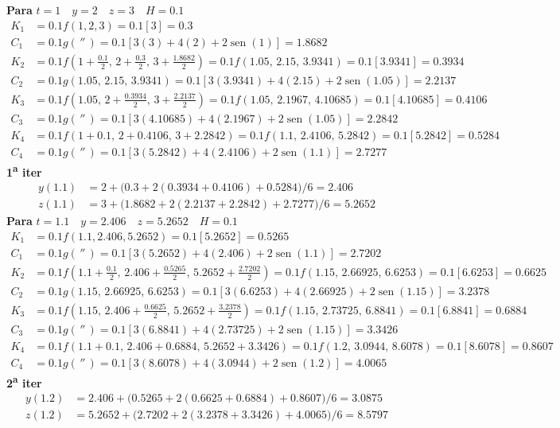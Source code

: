 \documentclass[11pt]{article}
\DeclareMathOperator{\sen}{sen}
\begin{document}
{\small
\textbf{Para} $t=1\quad y=2\quad z=3\quad H=0.1$\\[-2pt]
\begin{align*}
K_1&=0.1f(1,2,3)=0.1[3]=0.3\\
C_1&=0.1g(\,''\,)=0.1\left[3(3)+4(2)+2\sen(1)\right]=1.8682\\
K_2&=0.1f\left(1+\tfrac{0.1}{2},\,2+\tfrac{0.3}{2},\,3+\tfrac{1.8682}{2}\right)=0.1f(1.05,\,2.15,\,3.9341)=0.1[3.9341]=0.3934\\
C_2&=0.1g(1.05,\,2.15,\,3.9341)=0.1\left[3(3.9341)+4(2.15)+2\sen(1.05)\right]=2.2137\\
K_3&=0.1f\left(1.05,\,2+\tfrac{0.3934}{2},\,3+\tfrac{2.2137}{2}\right)=0.1f(1.05,\,2.1967,\,4.10685)=0.1[4.10685]=0.4106\\
C_3&=0.1g(\,''\,)=0.1\left[3(4.10685)+4(2.1967)+2\sen(1.05)\right]=2.2842\\
K_4&=0.1f(1+0.1,\,2+0.4106,\,3+2.2842)=0.1f(1.1,\,2.4106,\,5.2842)=0.1[5.2842]=0.5284\\
C_4&=0.1g(\,''\,)=0.1\left[3(5.2842)+4(2.4106)+2\sen(1.1)\right]=2.7277
\end{align*}
\textbf{1\textsuperscript{a} iter}\vspace{-4pt}
\begin{align*}
y(1.1)&=2+\big(0.3+2(0.3934+0.4106)+0.5284\big)/6=2.406\\
z(1.1)&=3+\big(1.8682+2(2.2137+2.2842)+2.7277\big)/6=5.2652
\end{align*}
\textbf{Para} $t=1.1\quad y=2.406\quad z=5.2652\quad H=0.1$\\[-2pt]
\begin{align*}
K_1&=0.1f(1.1,2.406,5.2652)=0.1[5.2652]=0.5265\\
C_1&=0.1g(\,''\,)=0.1\left[3(5.2652)+4(2.406)+2\sen(1.1)\right]=2.7202\\
K_2&=0.1f\left(1.1+\tfrac{0.1}{2},\,2.406+\tfrac{0.5265}{2},\,5.2652+\tfrac{2.7202}{2}\right)=0.1f(1.15,\,2.66925,\,6.6253)=0.1[6.6253]=0.6625\\
C_2&=0.1g(1.15,\,2.66925,\,6.6253)=0.1\left[3(6.6253)+4(2.66925)+2\sen(1.15)\right]=3.2378\\
K_3&=0.1f\left(1.15,\,2.406+\tfrac{0.6625}{2},\,5.2652+\tfrac{3.2378}{2}\right)=0.1f(1.15,\,2.73725,\,6.8841)=0.1[6.8841]=0.6884\\
C_3&=0.1g(\,''\,)=0.1\left[3(6.8841)+4(2.73725)+2\sen(1.15)\right]=3.3426\\
K_4&=0.1f(1.1+0.1,\,2.406+0.6884,\,5.2652+3.3426)=0.1f(1.2,\,3.0944,\,8.6078)=0.1[8.6078]=0.8607\\
C_4&=0.1g(\,''\,)=0.1\left[3(8.6078)+4(3.0944)+2\sen(1.2)\right]=4.0065
\end{align*}
\textbf{2\textsuperscript{a} iter}\vspace{-4pt}
\begin{align*}
y(1.2)&=2.406+\big(0.5265+2(0.6625+0.6884)+0.8607\big)/6=3.0875\\
z(1.2)&=5.2652+\big(2.7202+2(3.2378+3.3426)+4.0065\big)/6=8.5797
\end{align*}
}
\end{document}
